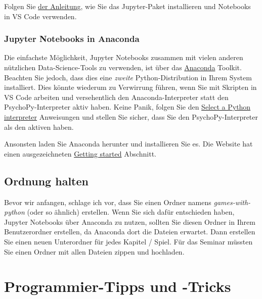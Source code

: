 \documentclass[
]{book}
\begin{document}
Folgen Sie \href{https://code.visualstudio.com/docs/datascience/jupyter-notebooks}{der Anleitung}, wie Sie das Jupyter-Paket installieren und Notebooks in VS Code verwenden.

\hypertarget{jupyter-notebooks-in-anaconda}{%
\subsection{Jupyter Notebooks in Anaconda}\label{jupyter-notebooks-in-anaconda}}

Die einfachste Möglichkeit, Jupyter Notebooks zusammen mit vielen anderen nützlichen Data-Science-Tools zu verwenden, ist über das \href{https://www.anaconda.com/products/individual}{Anaconda} Toolkit. Beachten Sie jedoch, dass dies eine \emph{zweite} Python-Distribution in Ihrem System installiert. Dies könnte wiederum zu Verwirrung führen, wenn Sie mit Skripten in VS Code arbeiten und versehentlich den Anaconda-Interpreter statt den PsychoPy-Interpreter aktiv haben. Keine Panik, folgen Sie den \href{https://code.visualstudio.com/docs/python/python-tutorial\#_select-a-python-interpreter}{Select a Python interpreter} Anweisungen und stellen Sie sicher, dass Sie den PsychoPy-Interpreter als den aktiven haben.

Ansonsten laden Sie Anaconda herunter und installieren Sie es. Die Website hat einen ausgezeichneten \href{https://docs.anaconda.com/anaconda/user-guide/getting-started/}{Getting started} Abschnitt.

\hypertarget{files-folder}{%
\section{Ordnung halten}\label{files-folder}}

Bevor wir anfangen, schlage ich vor, dass Sie einen Ordner namens \emph{games-with-python} (oder so ähnlich) erstellen. Wenn Sie sich dafür entschieden haben, Jupyter Notebooks über Anaconda zu nutzen, sollten Sie diesen Ordner in Ihrem Benutzerordner erstellen, da Anaconda dort die Dateien erwartet. Dann erstellen Sie einen neuen Unterordner für jedes Kapitel / Spiel. Für das Seminar müssten Sie einen Ordner mit allen Dateien zippen und hochladen.

\hypertarget{programming-tips}{%
\chapter{Programmier-Tipps und -Tricks}\label{programming-tips}}
\end{document}
